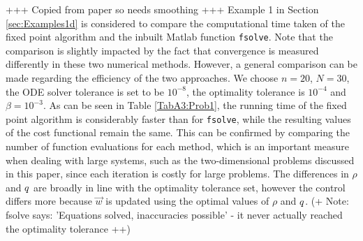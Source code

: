 +++ Copied from paper so needs smoothing +++
Example 1 in Section \ref{sec:Examples1d} is considered to compare the computational time taken of the fixed point algorithm and the inbuilt Matlab function \texttt{fsolve}. Note that the comparison is slightly impacted by the fact that convergence is measured differently in these two numerical methods. However, a general comparison can be made regarding the efficiency of the two approaches.
We choose $n=20$, $N=30$, the ODE solver tolerance is set to be $10^{-8}$, the optimality tolerance is $10^{-4}$ and $\beta = 10^{-3}$. 
As can be seen in Table \ref{TabA3:Prob1}, the running time of the fixed point algorithm is considerably faster than for \texttt{fsolve}, while the resulting values of the cost functional remain the same. This can be confirmed by comparing the number of function evaluations for each method, which is an important measure when dealing with large systems, such as the two-dimensional problems discussed in this paper, since each iteration is costly for large problems. The differences in $\rho$ and $q$ are broadly in line with the optimality tolerance set, however the control differs more because $\vec{w}$ is updated using the optimal values of $\rho$ and $q$. (+ Note: fsolve says: 'Equations solved, inaccuracies possible' - it never actually reached the optimality tolerance ++)
%
